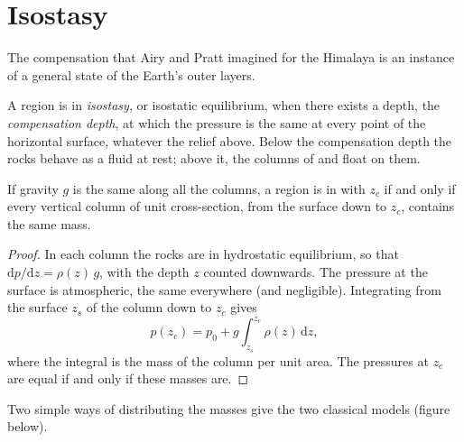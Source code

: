 \section{Isostasy}

The compensation that Airy and Pratt imagined for the Himalaya is an instance of
a general state of the Earth's outer layers.

\begin{definition}\label{def:b1:isostasy-gravity:isostasy}
A region is in \emph{isostasy}, or isostatic equilibrium, when
there exists a depth, the \emph{compensation depth},
at which the pressure is the same at every point of the horizontal surface,
whatever the relief above. Below the compensation depth the rocks behave as a
fluid at rest; above it, the columns of  and  float on them.
\end{definition}

\begin{proposition}\label{prop:b1:isostasy-gravity:equal-mass}
If gravity $g$ is the same along all the columns, a region is in  with
 $z_c$ if and only if every vertical column of unit
cross-section, from the surface down to $z_c$, contains the same mass.
\end{proposition}

\begin{proof}
In each column the rocks are in hydrostatic equilibrium, so that
$\mathrm dp/\mathrm dz = \rho(z)\,g$, with the depth $z$ counted downwards. The
pressure at the surface is atmospheric, the same everywhere (and negligible).
Integrating from the surface $z_s$ of the column down to $z_c$ gives
\[
  p(z_c) = p_0 + g\int_{z_s}^{z_c}\rho(z)\,\mathrm dz ,
\]
where the integral is the mass of the column per unit area. The pressures at
$z_c$ are equal if and only if these masses are.
\end{proof}

Two simple ways of distributing the masses give the two classical models
(figure below).

